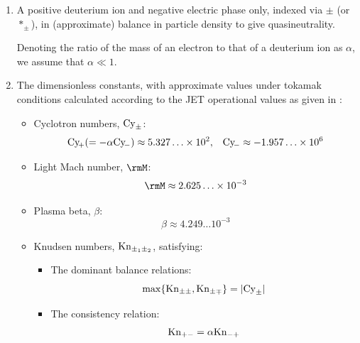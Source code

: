     \shortline

    \begin{enumerate}
        \item  A positive deuterium ion and negative electric phase only, indexed via $\pm$ (or $*_{\pm}$), in (approximate) balance in particle density to give quasineutrality.
        
        Denoting the ratio of the mass of an electron to that of a deuterium ion as $\alpha$, we assume that $\alpha  \ll  1$.

        \item  The dimensionless constants, with approximate values under tokamak conditions calculated according to the JET operational values as given in \cite{Wes00}:
        \begin{itemize}
            \item  Cyclotron numbers, $\mathrm{Cy}_{\pm}$:
            \begin{align}
                \mathrm{Cy}\!_{+}  (=  - \alpha\mathrm{Cy}\!_{-})  \approx    5.327\ldots\times 10^{2},  &&
                \mathrm{Cy}\!_{-}                          \approx  - 1.957\ldots\times 10^{6}
            \end{align}
            
            \item  Light Mach number, $\rmM$:
            \begin{equation}
                \rmM  \approx  2.625\ldots\times 10^{- 3}
            \end{equation}
            
            \item  Plasma beta, $\beta$:
            \begin{equation}
                \beta  \approx  4.249\ldots 10^{- 3}
            \end{equation}

            \item  Knudsen numbers, $\mathrm{Kn}_{\pm_{1}\pm_{2}}$, satisfying:
            \begin{itemize}
              \item  The dominant balance relations:
              \begin{equation}
                  \max\{\mathrm{Kn}_{\pm\pm},  \mathrm{Kn}_{\pm\mp}\}  =  |\mathrm{Cy}_{\pm}|
              \end{equation}
              
              \item  The consistency relation:
              \begin{equation}
                  \mathrm{Kn}_{+-}  =  \alpha\mathrm{Kn}_{-+}
              \end{equation}
            \end{itemize}
            

\end{itemize}
\end{enumerate}
